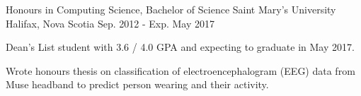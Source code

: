 

\begin{cventries}

  \cventry
    {Honours in Computing Science, Bachelor of Science} %
    {Saint Mary's University} %
    {Halifax, Nova Scotia} %
    {Sep. 2012 - Exp. May 2017} %
    {
      \begin{cvitems} %
        \item {Dean's List student with 3.6 / 4.0 GPA and expecting to graduate in May 2017.}
        \item {Wrote honours thesis on classification of electroencephalogram (EEG) data from Muse headband to predict person wearing and their activity.}
      \end{cvitems}
    }

\end{cventries}
